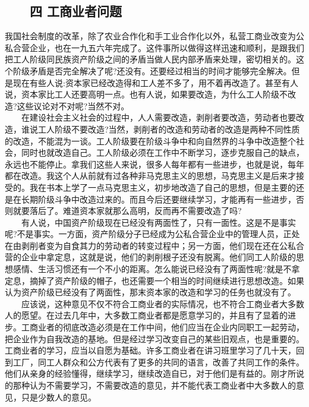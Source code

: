 \documentclass[cn,11pt,chinese]{elegantbook}
\def\myformat#1{\hfil\hfil #1}
\begin{document}
\subsection*{\myformat{　　四 工商业者问题}}
我国社会制度的改革，除了农业合作化和手工业合作化以外，私营工商业改变为公私合营企业，也在一九五六年完成了。这件事所以做得这样迅速和顺利，是跟我们把工人阶级同民族资产阶级之间的矛盾当做人民内部矛盾来处理，密切相关的。这个阶级矛盾是否完全解决了呢?还没有。还要经过相当的时间才能够完全解决。但是现在有些人说:资本家已经改造得和工人差不多了，用不着再改造了。甚至有人说，资本家比工人还要高明一点。也有人说，如果要改造，为什么工人阶级不改造?这些议论对不对呢?当然不对。\\
　　在建设社会主义社会的过程中，人人需要改造，剥削者要改造，劳动者也要改造，谁说工人阶级不要改造?当然，剥削者的改造和劳动者的改造是两种不同性质的改造，不能混为一谈。工人阶级要在阶级斗争中和向自然界的斗争中改造整个社会，同时也就改造自己。工人阶级必须在工作中不断学习，逐步克服自己的缺点，永远也不能停止。拿我们这些人来说，很多人每年都有一些进步，也就是说，每年都在改造。我这个人从前就有过各种非马克思主义的思想，马克思主义是后来才接受的。我在书本上学了一点马克思主义，初步地改造了自己的思想，但是主要的还是在长期阶级斗争中改造过来的。而且今后还要继续学习，才能再有一些进步，否则就要落后了。难道资本家就那么高明，反而再不需要改造了吗?\\
　　有人说，中国资产阶级现在已经没有两面性了，只有一面性。这是不是事实呢?不是事实。一方面，资产阶级分子已经成为公私合营企业中的管理人员，正处在由剥削者变为自食其力的劳动者的转变过程中；另一方面，他们现在还在公私合营的企业中拿定息，这就是说，他们的剥削根子还没有脱离。他们同工人阶级的思想感情、生活习惯还有一个不小的距离。怎么能说已经没有了两面性呢?就是不拿定息，摘掉了资产阶级的帽子，也还需要一个相当的时间继续进行思想改造。如果认为资产阶级已经没有了两面性，那末资本家的改造和学习的任务也就没有了。\\
　　应该说，这种意见不仅不符合工商业者的实际情况，也不符合工商业者大多数人的愿望。在过去几年中，大多数工商业者都是愿意学习的，并且有了显着的进步。工商业者的彻底改造必须是在工作中间，他们应当在企业内同职工一起劳动，把企业作为自我改造的基地。但是经过学习改变自己的某些旧观点，也是重要的。工商业者的学习，应当以自愿为基础。许多工商业者在讲习班里学习了几十天，回到工厂，同工人群众和公方代表有了更多的共同的语言，改善了共同工作的条件。他们从亲身的经验懂得，继续学习，继续改造自已，对于他们是有益的。刚才所说的那种认为不需要学习，不需要改造的意见，并不能代表工商业者中大多数人的意见，只是少数人的意见。\\
\end{document}
